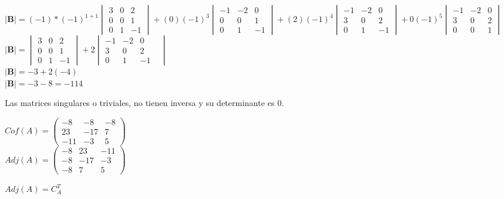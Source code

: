 \documentclass[stu, 12pt, letterpaper, donotrepeattitle, floatsintext, natbib]{apa7}
\begin{document}
\begin{itemize}
        $\textbf{|B|}=(-1)*(-1)^{1+1} \begin{vmatrix}
                                          3 & 0 & 2 \\ 0 & 0 & 1 \\ 0 & 1 & -1
        \end{vmatrix}
        +
        (0)(-1)^3 \begin{vmatrix}
                      -1 & -2 & 0 \\ 0 & 0 & 1 \\ 0 & 1 & -1
        \end{vmatrix}
        +
        (2)(-1)^4 \begin{vmatrix}
                      -1 & -2 & 0 \\ 3 & 0 & 2 \\ 0 & 1 & -1
        \end{vmatrix}
        +
        0(-1)^5 \begin{vmatrix}
                    -1 & -2 & 0 \\ 3 & 0 & 2 \\ 0 & 0 & 1
        \end{vmatrix}
        $\\[0.5cm]

        $\textbf{|B|}= \begin{vmatrix}
                           3 & 0 & 2 \\ 0 & 0 & 1 \\ 0 & 1 & -1
        \end{vmatrix}
        +
        2 \begin{vmatrix}
              -1 & -2 & 0 & \\ 3 & 0 & 2 \\ 0 & 1 & -1
        \end{vmatrix}
        $\\[0.5cm]
        $\textbf{|B|} = -3 + 2(-4)$\\[0.5cm]
        $\textbf{|B|} = -3-8 = -11 $4
    \end{itemize}

    Las matrices singulares o triviales, no tienen inversa y su determinante es 0.\\[0.5cm]
    \begin{paracol}{2}
        $
            {Cof}(A)= \begin{pmatrix}
                          -8 & -8 & -8 \\ 23 & -17 & 7 \\ -11 & -3 & 5
        \end{pmatrix}$\\
        \vspace{0.5cm}
        $
            {Adj}(A)=\begin{pmatrix}
                         -8 & 23 & -11 \\ -8 & -17 & -3 \\ -8 & 7 & 5
        \end{pmatrix}
        $

        \switchcolumn
        ${Adj}(A)=C_A^T$
    \end{paracol}
\end{document}
